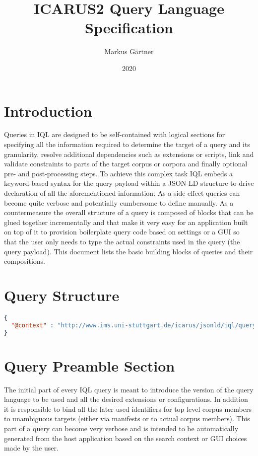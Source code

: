 \documentclass[11pt]{article}
\title{ICARUS2 Query Language Specification}
\author{Markus Gärtner}
\date{2020}
\begin{document}
\maketitle

\tableofcontents

\section{Introduction}
\label{sec:intro}

Queries in IQL are designed to be self-contained with logical sections for specifying all the information required to determine the target of a query and its granularity, resolve additional dependencies such as extensions or scripts, link and validate constraints to parts of the target corpus or corpora and finally optional pre- and post-processing steps. To achieve this complex task IQL embeds a keyword-based syntax for the query payload within a JSON-LD structure to drive declaration of all the aforementioned information. As a side effect queries can become quite verbose and potentially cumbersome to define manually. As a countermeasure the overall structure of a query is composed of blocks that can be glued together incrementally and that make it very easy for an application built on top of it to provision boilerplate query code based on settings or a GUI so that the user only needs to type the actual constraints used in the query (the query payload). This document lists the basic building blocks of queries and their compositions.

\section{Query Structure}
\label{sec:query-structure}

\begin{lstlisting}[language=json]
{
  "@context" : "http://www.ims.uni-stuttgart.de/icarus/jsonld/iql/query" 
}
\end{lstlisting}


\section{Query Preamble Section}
\label{sec:query-preamble}

The initial part of every IQL query is meant to introduce the version of the query language to be used and all the desired extensions or configurations. In addition it is responsible to bind all the later used identifiers for top level corpus members to unambiguous targets (either via manifests or to actual corpus members). This part of a query can become very verbose and is intended to be automatically generated from the host application based on the search context or GUI choices made by the user.
\end{document}
